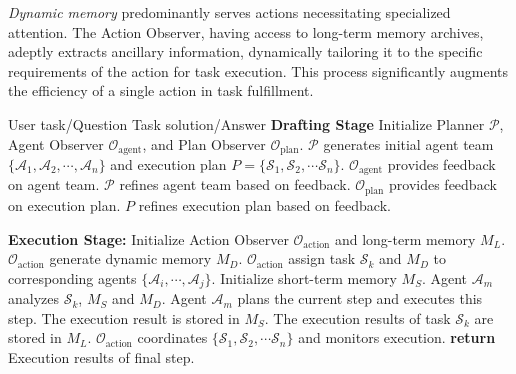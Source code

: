 \textit{Dynamic memory} predominantly serves actions necessitating specialized attention. The Action Observer, having access to long-term memory archives, adeptly extracts ancillary information, dynamically tailoring it to the specific requirements of the action for task execution. This process significantly augments the efficiency of a single action in task fulfillment.



\begin{algorithm}[!htb]
\renewcommand{\algorithmicrequire}{\textbf{Input:}}
\renewcommand{\algorithmicensure}{\textbf{Output:}}
\caption{AutoAgents Execution Process.}
\label{alg:1}
\begin{algorithmic}[1]
\REQUIRE User task/Question
\ENSURE Task solution/Answer
\STATE \textbf{Drafting Stage}
\STATE Initialize Planner $\mathcal{P}$, Agent Observer $\mathcal{O}_{\text{agent}}$, and Plan Observer $\mathcal{O}_{\text{plan}}$.
\STATE $\mathcal{P}$ generates initial agent team $\{\mathcal{A}_1, \mathcal{A}_2, \cdots, \mathcal{A}_n\}$ and execution plan $P = \{\mathcal{S}_1, \mathcal{S}_2, \cdots \mathcal{S}_n\}$.
\REPEAT
    \STATE $\mathcal{O}_{\text{agent}}$ provides feedback on agent team.
    \STATE $\mathcal{P}$ refines agent team based on feedback.
    \STATE $\mathcal{O}_{\text{plan}}$ provides feedback on execution plan.
    \STATE $P$ refines execution plan based on feedback.

\STATE \textbf{Execution Stage:}
\STATE Initialize Action Observer $\mathcal{O}_{\text{action}}$ and long-term memory $M_{L}$.
    \STATE $\mathcal{O}_{\text{action}}$ generate dynamic memory $M_{D}$.
    \STATE $\mathcal{O}_{\text{action}}$ assign task $\mathcal{S}_k$ and $M_{D}$ to corresponding agents $\{\mathcal{A}_i, \cdots, \mathcal{A}_j\}$.
    \STATE Initialize short-term memory $M_{S}$.
    \REPEAT
        \STATE Agent $\mathcal{A}_m$ analyzes $\mathcal{S}_k$, $M_{S}$ and  $M_{D}$.
        \STATE Agent $\mathcal{A}_m$ plans the current step and executes this step.
        \STATE The execution result is stored in $M_{S}$.
    \ENDFOR
    \STATE The execution results of task $\mathcal{S}_k$ are stored in $M_{L}$.
    \STATE $\mathcal{O}_{\text{action}}$ coordinates {$\{\mathcal{S}_1, \mathcal{S}_2, \cdots \mathcal{S}_n\}$} and monitors execution.
\ENDFOR
\STATE \textbf{return} Execution results of final step.
\end{algorithmic}  
\end{algorithm}




